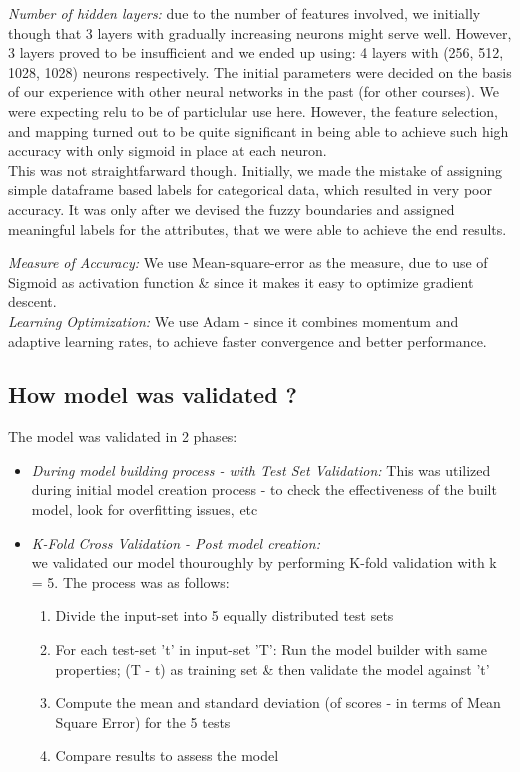 \documentclass[conference]{IEEEtran}
\begin{document}
{\begin{itemize}
				\textit{Number of hidden layers:} due to the number of features involved, we initially though that 3 layers with gradually increasing neurons might serve well. However, 3 layers proved to be insufficient and we ended up using:  4 layers with (256, 512, 1028, 1028) neurons respectively. The initial parameters were decided on the basis of our experience with other neural networks in the past (for other courses).   We were expecting relu to be of particlular use here. However, the feature selection, and mapping turned out to be quite significant in being able to achieve such high accuracy with only sigmoid in place at each neuron.\\
				This was not straightfarward though. Initially, we made the mistake of assigning simple dataframe based labels for categorical data, which resulted in very poor accuracy. It was only after we devised the fuzzy boundaries and assigned meaningful labels for the attributes, that we were able to achieve the end results.

				\textit{Measure of Accuracy:} We use Mean-square-error as the measure, due to use of Sigmoid as activation function \& since it makes it easy to optimize gradient descent.\\
				\textit{Learning Optimization:} We use Adam - since it combines momentum and adaptive learning rates, to achieve faster convergence and better performance.
		\end{itemize}


	\subsection{\textbf{How model was validated ?}}
		The model was validated in 2 phases:
		\begin{itemize}
			\item \textit{During model building process - with Test Set Validation:} This was utilized during initial model creation process - to check the effectiveness of the built model, look for overfitting issues, etc
			\item \textit{K-Fold Cross Validation - Post model creation:} \\
				we validated our model thouroughly by performing K-fold validation with k = 5. The process was as follows:
				\begin{enumerate}
					\item Divide the input-set into 5 equally distributed test sets
					\item For each test-set 't' in input-set 'T':  Run the model builder with same properties; (T - t) as training set  \&  then validate the model against 't' 
					\item Compute the mean and standard deviation (of scores - in terms of Mean Square Error) for the 5 tests
					\item Compare results to assess the model
				\end{enumerate}
		\end{itemize}


}
\end{document}
